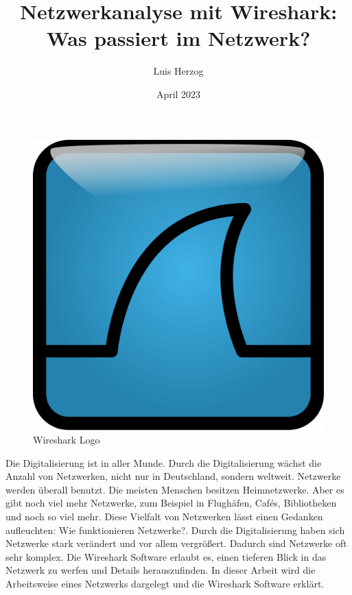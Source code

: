 \documentclass[12pt]{article}
\title{Netzwerkanalyse mit Wireshark: Was passiert im Netzwerk?}
\author{Luis Herzog}
\date{April 2023}
\begin{document}

\maketitle

\begin{figure}[h]
	\centering
	\includegraphics[scale=0.1]{Bilder/Wireshark_icon.svg.png}
	\caption{Wireshark Logo \cite{wireshark-logo}}
	\label{fig:figure1}
\end{figure}

\thispagestyle{empty}
\newpage
\tableofcontents
\thispagestyle{empty}
\newpage


Die Digitalisierung ist in aller Munde. Durch die Digitalisierung wächst die Anzahl von Netzwerken, nicht nur in Deutschland, sondern weltweit. Netzwerke werden überall benutzt. Die meisten Menschen besitzen Heimnetzwerke. Aber es gibt noch viel mehr Netzwerke, zum Beispiel in Flughäfen, Cafés, Bibliotheken und noch so viel mehr. Diese Vielfalt von Netzwerken lässt einen Gedanken aufleuchten: \glqq Wie funktionieren Netzwerke?\grqq. 
Durch die Digitalisierung haben sich Netzwerke stark verändert und vor allem vergrößert. Dadurch sind Netzwerke oft sehr komplex. Die Wireshark Software erlaubt es, einen tieferen Blick in das Netzwerk zu werfen und Details herauszufinden. In dieser Arbeit wird die Arbeitsweise eines Netzwerks dargelegt und die Wireshark Software erklärt. 
\end{document}
